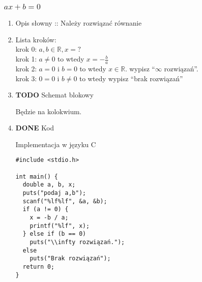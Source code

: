 \documentclass[11pt]{article}
\begin{document}
\subsubsection{\(ax+b=0\)}
\label{sec:org375e2e1}
\begin{enumerate}
\item Opis słowny :: Należy rozwiązać równanie
\label{sec:org2aa661d}
\item Lista kroków:
\label{sec:org5381ed6}
\\[0pt]
krok 0: \(a,b \in \mathbb{R}, x = ?\)
\\[0pt]
krok 1: \(a \ne 0\) to wtedy \(x = - \displaystyle\frac{b}{a}\)
\\[0pt]
krok 2: \(a = 0\) i \(b = 0\) to wtedy \(x \in \mathbb{R}\). wypisz ``\(\infty\) rozwiązań''.
\\[0pt]
krok 3: \(0 = 0\) i \(b \ne 0\) to wtedy wypisz ``brak rozwiązań''
\item {\bfseries\sffamily TODO} Schemat blokowy
\label{sec:org8400a61}

Będzie na kolokwium.
\item {\bfseries\sffamily DONE} Kod
\label{sec:org98d4d91}

Implementacja w języku C
\begin{verbatim}
#include <stdio.h>

int main() {
  double a, b, x;
  puts("podaj a,b");
  scanf("%lf%lf", &a, &b);
  if (a != 0) {
    x = -b / a;
    printf("%lf", x);
  } else if (b == 0)
    puts("\\infty rozwiązań.");
  else
    puts("Brak rozwiązań");
  return 0;
}
\end{verbatim}
\end{enumerate}
\end{document}

